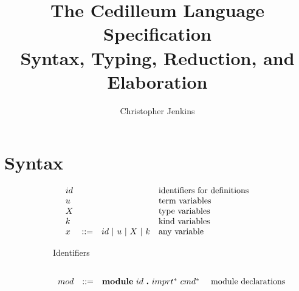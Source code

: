 \documentclass{article}
\begin{document}
\title{The Cedilleum Language Specification \\ \large Syntax, Typing, Reduction,
  and Elaboration }

\author{Christopher Jenkins}

\maketitle

\section{Syntax}

\begin{figure}
  \begin{subfigure}{1\linewidth}
    \[
      \begin{array}{llll}
        id & & & \textnormal{identifiers for definitions}
        \\ u & & & \textnormal{term variables}
        \\ X & & & \textnormal{type variables}
        \\ k & & & \textnormal{kind variables}
        \\ x
        & ::= & id\ |\ u\ |\ X\ |\ k
        & \textnormal{any variable}
      \end{array}
    \]
    \caption{Identifiers}
  \end{subfigure}

  \begin{subfigure}{1\linewidth}
    \[
      \begin{array}{llll}
        \\ mod
        & ::= & \textbf{module}\ id\ \textbf{.}\ imprt^*\ cmd^*\
        & \textnormal{module declarations}


\end{array}\]
\end{subfigure}
\end{figure}
\end{document}

